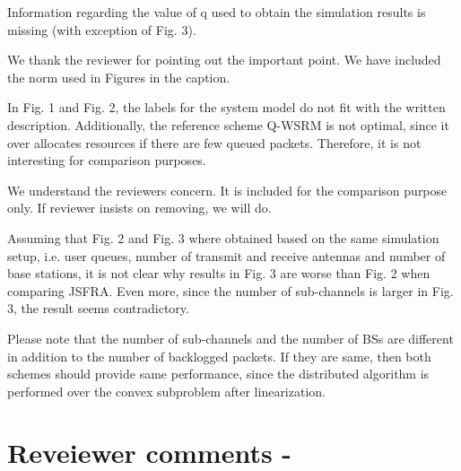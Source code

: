 \begin{itemize}
 Information regarding the value of q used to obtain the simulation results is missing (with exception of Fig. 3).

\resp We thank the reviewer for pointing out the important point. We have included the norm used in Figures in the caption.

 In Fig. 1 and Fig. 2, the labels for the system model do not fit with the written description. Additionally, the reference scheme Q-WSRM is not optimal, since it over allocates resources if there are few queued packets. Therefore, it is not interesting for comparison purposes.

\resp We understand the reviewers concern. It is included for the comparison purpose only. If reviewer insists on removing, we will do.

 Assuming that Fig. 2 and Fig. 3 where obtained based on the same simulation setup, i.e. user queues, number of transmit and receive antennas and number of base stations, it is not clear why results in Fig. 3 are worse than Fig. 2 when comparing JSFRA. Even more, since the number of sub-channels is larger in Fig. 3, the result seems contradictory.

\resp Please note that the number of sub-channels and the number of \acp{BS} are different in addition to the number of backlogged packets. If they are same, then both schemes should provide same performance, since the distributed algorithm is performed over the convex subproblem after linearization.

\end{itemize}

\section*{Reveiewer comments - }

